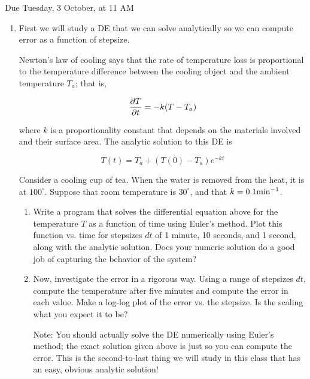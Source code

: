 \documentclass[12pt]{article}
\def\PAR#1#2{ {{\partial #1}\over{\partial #2}} }
\begin{document}
\Large
\centerline{}
\centerline{Due Tuesday, 3 October, at 11 AM}
\normalsize

\begin{enumerate}
\item{

First we will study a DE that we can solve analytically so we can compute error as a function of stepsize.

Newton's law of cooling says that the rate of temperature loss is proportional to the temperature difference between the cooling object and the ambient temperature $T_a$; that is,

\begin{equation}
\PAR{T}{t} = -k(T-T_a)
\end{equation}

where $k$ is a proportionality constant that depends on the materials involved and their surface area. The analytic solution to this DE is

\begin{equation}
T(t) = T_a + (T(0) - T_a)e^{-kt}
\end{equation}
  
Consider a cooling cup of tea. When the water is removed from the heat, it is at $100^\circ$. Suppose that room temperature is $30^\circ$, and that $k=0.1 {\rm {min}}^{-1}$.

\begin{enumerate}

\item{Write a program that solves the differential equation above for the temperature $T$ as a function of time using Euler's method. Plot this function vs. time for stepsizes $dt$ of 1 minute, 10 seconds, and 1 second, along
with the analytic solution. Does your numeric solution do a good job of capturing the behavior of the system?}

\item{Now, investigate the error in a rigorous way. Using a range of stepsizes $dt$, compute the temperature after five minutes and compute the error in each value. 
Make a log-log plot of the error vs. the stepsize. Is the scaling what you expect it to be?}

Note: You should actually solve the DE numerically using Euler's method; the exact solution given above is just so you can compute the error. This is the second-to-last thing we will study in this class that has an easy, obvious analytic solution!

\end{enumerate}
}


\end{enumerate}
\end{document}
